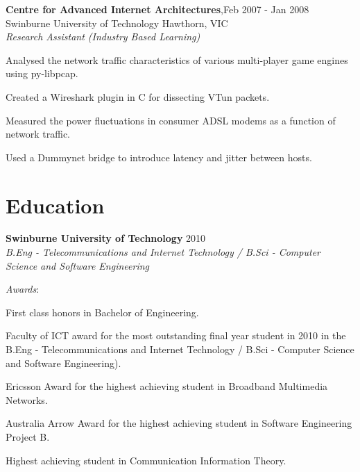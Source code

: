 \documentclass[line,margin]{res}
\begin{document}
\begin{resume}
        \textbf{Centre for Advanced Internet Architectures},\hfill Feb 2007 - Jan 2008 \\
        Swinburne University of Technology Hawthorn, VIC \\
        \textit{Research Assistant (Industry Based Learning)}\\
        
        \begin{list}{}{\leftmargin=1em \itemsep=-2pt}
            \item{Analysed the network traffic characteristics of various multi-player game engines using
            py-libpcap.}
            \item{Created a Wireshark plugin in C for dissecting VTun packets.}
            \item{Measured the power fluctuations in consumer ADSL modems as a function of network traffic.}
            \item{Used a Dummynet bridge to introduce latency and jitter between hosts.}
        \end{list}

        \section{Education}
        \textbf{Swinburne University of Technology} \hfill 2010\\
        \textit{B.Eng - Telecommunications and Internet Technology / B.Sci - Computer Science and
        Software Engineering}

        \textit{Awards}:
        \begin{list}{}{\leftmargin=1em \itemsep=-2pt}
            \item{First class honors in Bachelor of Engineering.}
            \item{Faculty of ICT award for the most outstanding final year student in 2010 in the B.Eng -
            Telecommunications and Internet Technology / B.Sci - Computer Science and Software
            Engineering).}
            \item{Ericsson Award for the highest achieving student in Broadband Multimedia Networks.}
            \item{Australia Arrow Award for the highest achieving student in Software Engineering Project B.}
            \item{Highest achieving student in Communication Information Theory.}
        \end{list}


\end{resume}
\end{document}
